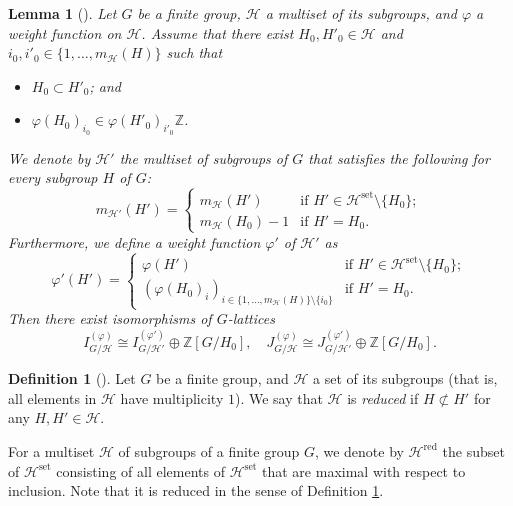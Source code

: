 \documentclass[12pt]{amsart}
\theoremstyle{plain}
\newtheorem{lem}[thm]{Lemma}
\theoremstyle{definition}
\newtheorem{dfn}[thm]{Definition}
\numberwithin{thm}{section}
\numberwithin{equation}{section}
\newcommand{\Z}{\mathbb{Z}}
\newcommand{\cH}{\mathcal{H}}
\DeclareMathOperator{\red}{red}
\DeclareMathOperator{\set}{set}
\begin{document}
\begin{lem}[{\cite[Lemma 3.10]{Hasegawa}}]\label{lem:rded}
Let $G$ be a finite group, $\cH$ a multiset of its subgroups, and $\varphi$ a weight function on $\cH$. Assume that there exist $H_{0},H'_{0}\in \cH$ and $i_{0},i'_{0}\in \{1,\ldots,m_{\cH}(H)\}$ such that
\begin{itemize}
\item $H_{0}\subset H'_{0}$; and
\item ${\varphi}(H_{0})_{i_{0}}\in {\varphi}(H'_{0})_{i'_{0}}\Z$. 
\end{itemize}
We denote by $\cH'$ the multiset of subgroups of $G$ that satisfies the following for every subgroup $H$ of $G$: 
\begin{equation*}
m_{\cH'}(H')=
\begin{cases}
    m_{\cH}(H')&\text{if }H'\in \cH^{\set}\setminus \{H_0\};\\
    m_{\cH}(H_{0})-1&\text{if }H'=H_{0}. 
\end{cases}
\end{equation*}
Furthermore, we define a weight function $\varphi'$ of $\cH'$ as 
\begin{equation*}
\varphi'(H')=
\begin{cases}
    \varphi(H')&\text{if }H'\in \cH^{\set}\setminus \{H_0\};\\
    (\varphi(H_{0})_{i})_{i\in \{1,\ldots,m_{\cH}(H)\}\setminus \{i_{0}\}}&\text{if }H'=H_{0}. 
\end{cases}
\end{equation*}
Then there exist isomorphisms of $G$-lattices
\begin{equation*}
I_{G/\cH}^{(\varphi)} \cong I_{G/\cH'}^{({\varphi'})} \oplus \Z[G/H_{0}],\quad
J_{G/\cH}^{(\varphi)} \cong J_{G/\cH'}^{({\varphi'})} \oplus \Z[G/H_{0}]. 
\end{equation*}
\end{lem}

\begin{dfn}[{\cite[Definition 3.12]{Hasegawa}}]\label{dfn:reds}
Let $G$ be a finite group, and $\cH$ a set of its subgroups (that is, all elements in $\cH$ have multiplicity $1$). We say that $\cH$ is \emph{reduced} if $H\not\subset H'$ for any $H,H'\in \cH$. 
\end{dfn}

For a multiset $\cH$ of subgroups of a finite group $G$, we denote by $\cH^{\red}$ the subset of $\cH^{\set}$ consisting of all elements of $\cH^{\set}$ that are maximal with respect to inclusion. Note that it is reduced in the sense of Definition \ref{dfn:reds}. 
\end{document}
